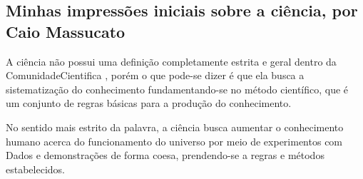 \subsection{Minhas impressões iniciais sobre a ciência, por Caio Massucato}
\label{chap:CaioMassucato:impressoes}


A ciência não possui uma definição completamente estrita e geral dentro da \gls{ComunidadeCientifica} \citep{schwartzman_ciencia_1984}, porém o que pode-se dizer é que ela busca a sistematização do conhecimento fundamentando-se no método científico, que é um conjunto de regras básicas para a produção do conhecimento.

No sentido mais estrito da palavra, a ciência busca aumentar o conhecimento humano acerca do funcionamento do universo por meio de experimentos com \gls{Dados} e demonstrações de forma coesa, prendendo-se a regras e métodos estabelecidos.
